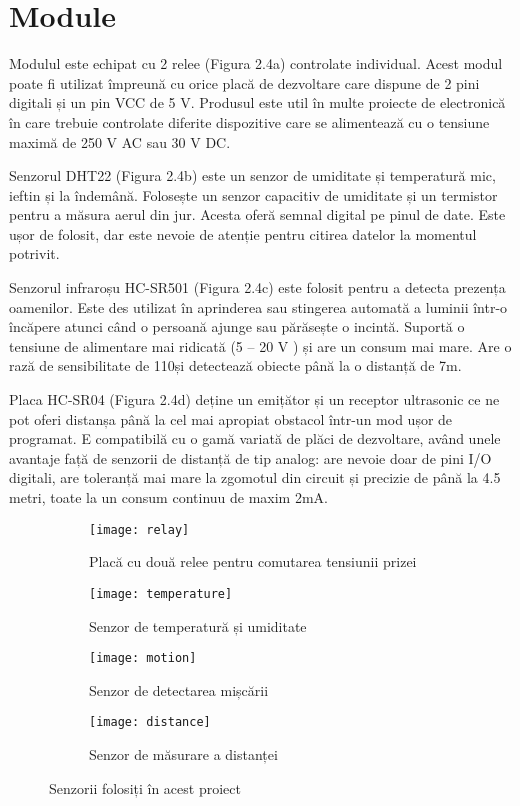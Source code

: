 \section{Module} 

Modulul este echipat cu 2 relee (Figura 2.4a) controlate individual. Acest modul poate fi utilizat împreună cu orice placă de dezvoltare care dispune de 2 pini digitali și un pin VCC de 5 V. Produsul este util în multe proiecte de electronică în care trebuie controlate diferite dispozitive care se alimentează cu o tensiune maximă de 250 V AC sau 30 V DC.

Senzorul DHT22 (Figura 2.4b) este un senzor de umiditate și temperatură mic, ieftin și la îndemână. Folosește un senzor capacitiv de umiditate și un termistor pentru a măsura aerul din jur. Acesta oferă semnal digital pe pinul de date. Este ușor de folosit, dar este nevoie de atenție pentru citirea datelor la momentul potrivit.

Senzorul infraroșu HC-SR501 (Figura 2.4c) este folosit pentru a detecta prezența oamenilor. Este des utilizat în aprinderea sau stingerea automată a luminii într-o încăpere atunci când o persoană ajunge sau părăsește o incintă. Suportă o tensiune de alimentare mai ridicată (5 – 20 V ) și are un consum mai mare. Are o rază de sensibilitate de 110\textdegree și detectează obiecte până la o distanță de 7m.

Placa HC-SR04 (Figura 2.4d) deține un emițător și un receptor ultrasonic ce ne pot oferi distanșa până la cel mai apropiat obstacol într-un mod ușor de programat. E compatibilă cu o gamă variată de plăci de dezvoltare, având unele avantaje față de senzorii de distanță de tip analog: are nevoie doar de pini I/O digitali, are toleranță mai mare la zgomotul din circuit și precizie de până la 4.5 metri, toate la un consum continuu de maxim 2mA.

\begin{figure}[h]
	\centering
	\begin{subfigure}{0.45\textwidth}
		\texttt{[image: relay]}
		\caption{Placă cu două relee pentru comutarea tensiunii prizei}
		\label{fig:relay}
	\end{subfigure}
	\hfill
	\begin{subfigure}{0.45\textwidth}
		\texttt{[image: temperature]}
		\caption{Senzor de temperatură și umiditate}
		\label{fig:temperature}
	\end{subfigure}
	\begin{subfigure}{0.45\textwidth}
		\texttt{[image: motion]}
		\caption{Senzor de detectarea mișcării}
		\label{fig:motion}
	\end{subfigure}
	\hfill
		\begin{subfigure}{0.45\textwidth}
		\texttt{[image: distance]}
		\caption{Senzor de măsurare a distanței}
		\label{fig:distance}
	\end{subfigure}
	\hfill
	\caption{Senzorii folosiți în acest proiect}
	\label{fig:all}
\end{figure}

